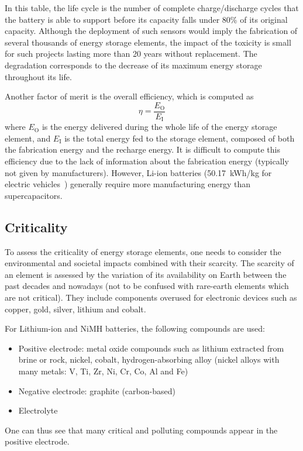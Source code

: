 \documentclass{EPL-master-thesis-covers-EN}
\newcommand{\te}[1]{\textrm{#1}}
\begin{document}
In this table, the life cycle is the number of complete charge/discharge cycles that the battery is able to support before its capacity falls under 80\% of its original capacity.
Although the deployment of such sensors would imply the fabrication of several thousands of energy storage elements, the impact of the toxicity is small for such projects lasting more than 20 years without replacement. The degradation corresponds to the decrease of its maximum energy storage throughout its life.

Another factor of merit is the overall efficiency, which is computed as
\[
 \eta = \frac{E_\te{O}}{E_\te{I}}
\]
where $E_\te{O}$ is the energy delivered during the whole life of the energy storage element, and $E_\te{I}$ is the total energy fed to the storage element, composed of both the fabrication energy and the recharge energy. It is difficult to compute this efficiency due to the lack of information about the fabrication energy (typically not given by manufacturers). However, Li-ion batteries (\SI{50.17}{kWh/kg} for electric vehicles~\cite{manufacturing_lithium}) generally require more manufacturing energy than supercapacitors.


\subsection*{Criticality}

To assess the criticality of energy storage elements, one needs to consider the environmental and societal impacts combined with their scarcity. The scarcity of an element is assessed by the variation of its availability on Earth between the past decades and nowadays (not to be confused with rare-earth elements which are not critical). They include components overused for electronic devices such as copper, gold, silver, lithium and cobalt.

For Lithium-ion and NiMH batteries, the following compounds are used:
\begin{itemize}
 \item Positive electrode: metal oxide compounds such as lithium extracted from brine or rock, nickel, cobalt, hydrogen-absorbing alloy (nickel alloys with many metals: V, Ti, Zr, Ni, Cr, Co, Al and Fe)
 \item Negative electrode: graphite (carbon-based)
 \item Electrolyte
\end{itemize}

One can thus see that many critical and polluting compounds appear in the positive electrode.
\end{document}
